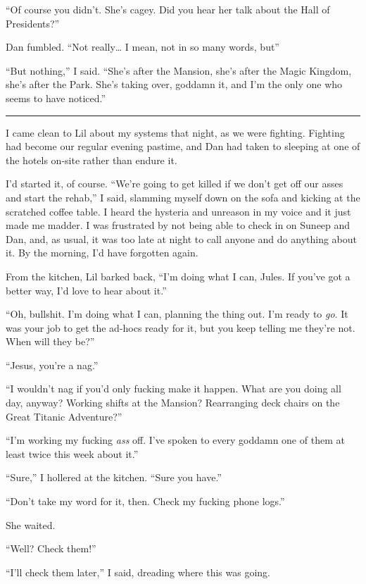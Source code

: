 “Of course you didn't. She's cagey. Did you hear her talk about the
Hall of Presidents?”

Dan fumbled. “Not really… I mean, not in so many words, but{\dash}”

“But nothing,” I said. “She's after the Mansion, she's after the
Magic Kingdom, she's after the Park. She's taking over, goddamn it,
and I'm the only one who seems to have noticed.”

\begin{center}\rule{3in}{0.4pt}\end{center}

I came clean to Lil about my systems that night, as we were
fighting. Fighting had become our regular evening pastime, and Dan
had taken to sleeping at one of the hotels on-site rather than
endure it.

I'd started it, of course. “We're going to get killed if we don't
get off our asses and start the rehab,” I said, slamming myself
down on the sofa and kicking at the scratched coffee table. I heard
the hysteria and unreason in my voice and it just made me madder. I
was frustrated by not being able to check in on Suneep and Dan,
and, as usual, it was too late at night to call anyone and do
anything about it. By the morning, I'd have forgotten again.

From the kitchen, Lil barked back, “I'm doing what I can, Jules. If
you've got a better way, I'd love to hear about it.”

“Oh, bullshit. I'm doing what I can, planning the thing out. I'm
ready to \emph{go}. It was your job to get the ad-hocs ready for
it, but you keep telling me they're not. When will they be?”

“Jesus, you're a nag.”

“I wouldn't nag if you'd only fucking make it happen. What are you
doing all day, anyway? Working shifts at the Mansion? Rearranging
deck chairs on the Great Titanic Adventure?”

“I'm working my fucking \emph{ass} off. I've spoken to every
goddamn one of them at least twice this week about it.”

“Sure,” I hollered at the kitchen. “Sure you have.”

“Don't take my word for it, then. Check my fucking phone logs.”

She waited.

“Well? Check them!”

“I'll check them later,” I said, dreading where this was going.

